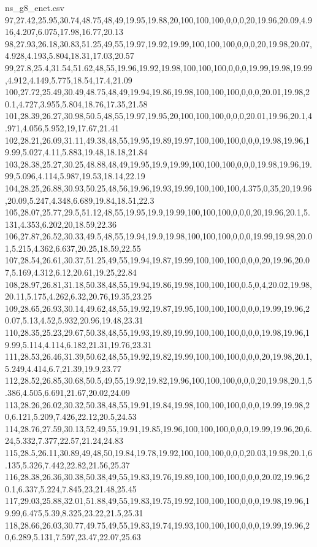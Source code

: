 \begin{filecontents*}[overwrite]{ns_g8_enet.csv}
97,27.42,25.95,30.74,48.75,48,49,19.95,19.88,20,100,100,100,0,0,0,20,19.96,20.09,4.916,4.207,6.075,17.98,16.77,20.13
98,27.93,26.18,30.83,51.25,49,55,19.97,19.92,19.99,100,100,100,0,0,0,20,19.98,20.07,4.928,4.193,5.804,18.31,17.03,20.57
99,27.8,25.4,31.54,51.62,48,55,19.96,19.92,19.98,100,100,100,0,0,0,19.99,19.98,19.99,4.912,4.149,5.775,18.54,17.4,21.09
100,27.72,25.49,30.49,48.75,48,49,19.94,19.86,19.98,100,100,100,0,0,0,20.01,19.98,20.1,4.727,3.955,5.804,18.76,17.35,21.58
101,28.39,26.27,30.98,50.5,48,55,19.97,19.95,20,100,100,100,0,0,0,20.01,19.96,20.1,4.971,4.056,5.952,19,17.67,21.41
102,28.21,26.09,31.11,49.38,48,55,19.95,19.89,19.97,100,100,100,0,0,0,19.98,19.96,19.99,5.027,4.11,5.883,19.48,18.18,21.84
103,28.38,25.27,30.25,48.88,48,49,19.95,19.9,19.99,100,100,100,0,0,0,19.98,19.96,19.99,5.096,4.114,5.987,19.53,18.14,22.19
104,28.25,26.88,30.93,50.25,48,56,19.96,19.93,19.99,100,100,100,4.375,0,35,20,19.96,20.09,5.247,4.348,6.689,19.84,18.51,22.3
105,28.07,25.77,29.5,51.12,48,55,19.95,19.9,19.99,100,100,100,0,0,0,20,19.96,20.1,5.131,4.353,6.202,20,18.59,22.36
106,27.87,26.52,30.33,49.5,48,55,19.94,19.9,19.98,100,100,100,0,0,0,19.99,19.98,20.01,5.215,4.362,6.637,20.25,18.59,22.55
107,28.54,26.61,30.37,51.25,49,55,19.94,19.87,19.99,100,100,100,0,0,0,20,19.96,20.07,5.169,4.312,6.12,20.61,19.25,22.84
108,28.97,26.81,31.18,50.38,48,55,19.94,19.86,19.98,100,100,100,0.5,0,4,20.02,19.98,20.11,5.175,4.262,6.32,20.76,19.35,23.25
109,28.65,26.93,30.14,49.62,48,55,19.92,19.87,19.95,100,100,100,0,0,0,19.99,19.96,20.07,5.13,4.52,5.932,20.96,19.48,23.31
110,28.35,25.23,29.67,50.38,48,55,19.93,19.89,19.99,100,100,100,0,0,0,19.98,19.96,19.99,5.114,4.114,6.182,21.31,19.76,23.31
111,28.53,26.46,31.39,50.62,48,55,19.92,19.82,19.99,100,100,100,0,0,0,20,19.98,20.1,5.249,4.414,6.7,21.39,19.9,23.77
112,28.52,26.85,30.68,50.5,49,55,19.92,19.82,19.96,100,100,100,0,0,0,20,19.98,20.1,5.386,4.505,6.691,21.67,20.02,24.09
113,28.26,26.02,30.32,50.38,48,55,19.91,19.84,19.98,100,100,100,0,0,0,19.99,19.98,20,6.121,5.209,7.426,22.12,20.5,24.53
114,28.76,27.59,30.13,52,49,55,19.91,19.85,19.96,100,100,100,0,0,0,19.99,19.96,20,6.24,5.332,7.377,22.57,21.24,24.83
115,28.5,26.11,30.89,49,48,50,19.84,19.78,19.92,100,100,100,0,0,0,20.03,19.98,20.1,6.135,5.326,7.442,22.82,21.56,25.37
116,28.38,26.36,30.38,50.38,49,55,19.83,19.76,19.89,100,100,100,0,0,0,20.02,19.96,20.1,6.337,5.224,7.845,23,21.48,25.45
117,29.03,25.88,32.01,51.88,49,55,19.83,19.75,19.92,100,100,100,0,0,0,19.98,19.96,19.99,6.475,5.39,8.325,23.22,21.5,25.31
118,28.66,26.03,30.77,49.75,49,55,19.83,19.74,19.93,100,100,100,0,0,0,19.99,19.96,20,6.289,5.131,7.597,23.47,22.07,25.63

\end{filecontents*}
